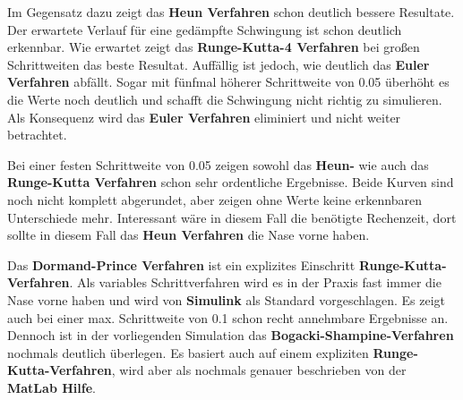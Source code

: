 \documentclass[12pt,a4paper]{scrartcl}	%
\begin{document}
\begin{figure} [htb]
\end{figure}   
Im Gegensatz dazu zeigt das \textbf{Heun Verfahren} schon deutlich bessere Resultate. Der erwartete Verlauf für eine gedämpfte Schwingung ist schon deutlich erkennbar. Wie erwartet zeigt das \textbf{ Runge-Kutta-4 Verfahren} bei großen Schrittweiten das beste Resultat. Auffällig ist jedoch, wie deutlich das \textbf{Euler Verfahren} abfällt. Sogar mit fünfmal höherer Schrittweite von 0.05 überhöht es die Werte noch deutlich und schafft die Schwingung nicht richtig zu simulieren. Als Konsequenz wird das \textbf{Euler Verfahren} eliminiert und nicht weiter betrachtet.
\begin{figure} [htb]
\end{figure}  
Bei einer festen Schrittweite von 0.05 zeigen sowohl das \textbf{Heun-} wie auch das \textbf{ Runge-Kutta Verfahren} schon sehr ordentliche Ergebnisse. Beide Kurven sind noch nicht komplett abgerundet, aber zeigen ohne Werte keine erkennbaren Unterschiede mehr. Interessant wäre in diesem Fall die benötigte Rechenzeit, dort sollte in diesem Fall das  \textbf{Heun Verfahren} die Nase vorne haben.
\begin{figure} [htb]
\end{figure}
Das \textbf{Dormand-Prince Verfahren} ist ein explizites Einschritt \textbf{Runge-Kutta-Verfahren}. Als variables Schrittverfahren wird es in der Praxis fast immer die Nase vorne haben und wird von \textbf{Simulink} als Standard vorgeschlagen. Es zeigt auch bei einer max. Schrittweite von 0.1 schon recht annehmbare Ergebnisse an. Dennoch ist in der vorliegenden Simulation das \textbf{Bogacki-Shampine-Verfahren} nochmals deutlich überlegen. Es basiert auch auf einem expliziten \textbf{Runge-Kutta-Verfahren}, wird aber als nochmals genauer beschrieben von der \textbf{MatLab Hilfe}.\\
\end{document}
